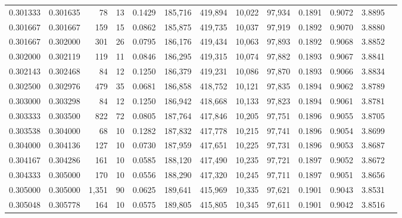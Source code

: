 \begin{tabular}{rrrrrrrrrrrrr}
0.301333 & 0.301635 &    78 &  13 &                                     0.1429 & 185,716 & 419,894 &  10,022 &  97,934 & 0.1891 & 0.9072 & 3.8895 \\
0.301667 & 0.301667 &   159 &  15 &                                     0.0862 & 185,875 & 419,735 &  10,037 &  97,919 & 0.1892 & 0.9070 & 3.8880 \\
0.301667 & 0.302000 &   301 &  26 &                                     0.0795 & 186,176 & 419,434 &  10,063 &  97,893 & 0.1892 & 0.9068 & 3.8852 \\
0.302000 & 0.302119 &   119 &  11 &                                     0.0846 & 186,295 & 419,315 &  10,074 &  97,882 & 0.1893 & 0.9067 & 3.8841 \\
0.302143 & 0.302468 &    84 &  12 &                                     0.1250 & 186,379 & 419,231 &  10,086 &  97,870 & 0.1893 & 0.9066 & 3.8834 \\
0.302500 & 0.302976 &   479 &  35 &                                     0.0681 & 186,858 & 418,752 &  10,121 &  97,835 & 0.1894 & 0.9062 & 3.8789 \\
0.303000 & 0.303298 &    84 &  12 &                                     0.1250 & 186,942 & 418,668 &  10,133 &  97,823 & 0.1894 & 0.9061 & 3.8781 \\
0.303333 & 0.303500 &   822 &  72 &                                     0.0805 & 187,764 & 417,846 &  10,205 &  97,751 & 0.1896 & 0.9055 & 3.8705 \\
0.303538 & 0.304000 &    68 &  10 &                                     0.1282 & 187,832 & 417,778 &  10,215 &  97,741 & 0.1896 & 0.9054 & 3.8699 \\
0.304000 & 0.304136 &   127 &  10 &                                     0.0730 & 187,959 & 417,651 &  10,225 &  97,731 & 0.1896 & 0.9053 & 3.8687 \\
0.304167 & 0.304286 &   161 &  10 &                                     0.0585 & 188,120 & 417,490 &  10,235 &  97,721 & 0.1897 & 0.9052 & 3.8672 \\
0.304333 & 0.305000 &   170 &  10 &                                     0.0556 & 188,290 & 417,320 &  10,245 &  97,711 & 0.1897 & 0.9051 & 3.8656 \\
0.305000 & 0.305000 & 1,351 &  90 &                                     0.0625 & 189,641 & 415,969 &  10,335 &  97,621 & 0.1901 & 0.9043 & 3.8531 \\
0.305048 & 0.305778 &   164 &  10 &                                     0.0575 & 189,805 & 415,805 &  10,345 &  97,611 & 0.1901 & 0.9042 & 3.8516 \\

\end{tabular}
